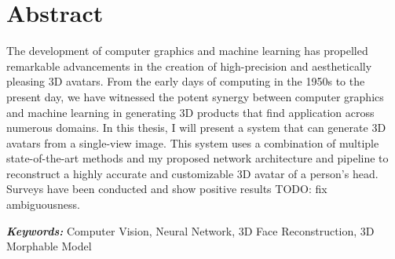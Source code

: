




\section*{Abstract}

The development of computer graphics and machine learning has propelled remarkable advancements in the creation of high-precision and aesthetically pleasing 3D avatars. From the early days of computing in the 1950s to the present day, we have witnessed the potent synergy between computer graphics and machine learning in generating 3D products that find application across numerous domains. In this thesis, I will present a system that can generate 3D avatars from a single-view image. This system uses a combination of multiple state-of-the-art methods and my proposed network architecture and pipeline to reconstruct a highly accurate and customizable 3D avatar of a person's head. Surveys have been conducted and show positive results {TODO: fix ambiguousness}.

\textbf{\textit{Keywords:}} Computer Vision, Neural Network, 3D Face Reconstruction, 3D Morphable Model